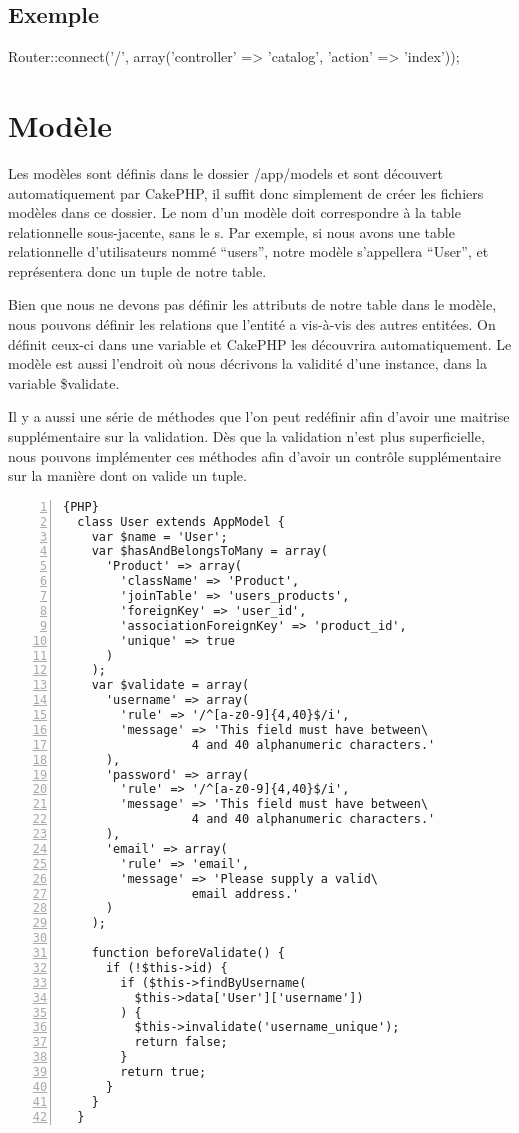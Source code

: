 \documentclass[12pt]{article}
\begin{document}
    \subsection*{Exemple}
      Router::connect('/', array('controller' => 'catalog', 'action' => 'index'));
  \section{Modèle}
    Les modèles sont définis dans le dossier /app/models et sont découvert automatiquement par CakePHP, il suffit donc simplement de créer les fichiers modèles dans ce dossier. Le nom d'un modèle doit correspondre à la table relationnelle sous-jacente, sans le s. Par exemple, si nous avons une table relationnelle d'utilisateurs nommé “users”, notre modèle s'appellera “User”, et représentera donc un tuple de notre table.
    
    Bien que nous ne devons pas définir les attributs de notre table dans le modèle, nous pouvons définir les relations que l'entité a vis-à-vis des autres entitées. On définit ceux-ci dans une variable et CakePHP les découvrira automatiquement. 
Le modèle est aussi l'endroit où nous décrivons la validité d'une instance, dans la variable \$validate.

    Il y a aussi une série de méthodes que l'on peut redéfinir afin d'avoir une maitrise supplémentaire sur la validation. Dès que la validation n'est plus superficielle, nous pouvons implémenter ces méthodes afin d'avoir un contrôle supplémentaire sur la manière dont on valide un tuple.
    \begin{lstlisting}[numbers=left,firstnumber=1,numbersep=-8pt,caption=Exemple modèle]{PHP}
  class User extends AppModel {
    var $name = 'User';    
    var $hasAndBelongsToMany = array(
      'Product' => array(
        'className' => 'Product',
        'joinTable' => 'users_products',
        'foreignKey' => 'user_id',
        'associationForeignKey' => 'product_id',
        'unique' => true
      )
    );
    var $validate = array(
      'username' => array(
        'rule' => '/^[a-z0-9]{4,40}$/i',
        'message' => 'This field must have between\
                  4 and 40 alphanumeric characters.'
      ),
      'password' => array(
        'rule' => '/^[a-z0-9]{4,40}$/i',
        'message' => 'This field must have between\
                  4 and 40 alphanumeric characters.'
      ),
      'email' => array(
        'rule' => 'email',
        'message' => 'Please supply a valid\
                  email address.'
      )
    );

    function beforeValidate() {
      if (!$this->id) {
        if ($this->findByUsername(
          $this->data['User']['username'])
        ) {
          $this->invalidate('username_unique');
          return false;
        }
        return true;
      }
    }
  }
    \end{lstlisting}
\end{document}
